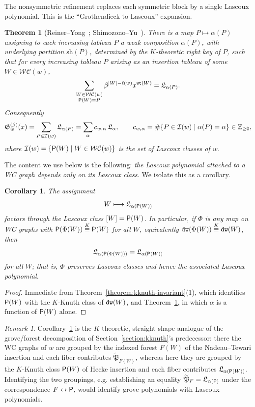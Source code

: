 \documentclass{amsart}
\newtheorem{corollary}[lemma]{Corollary}
\newtheorem{theorem}[lemma]{Theorem}
\newcommand{\grove}{\widetilde{\mathfrak{P}}}
\theoremstyle{definition}
\theoremstyle{remark}
\newtheorem*{remark}{Remark}
\numberwithin{equation}{subsection}
\newcommand{\wtt}{\mathtt{wt}}
\newcommand{\WC}{\mathcal{WC}}
\begin{document}
The nonsymmetric refinement replaces each symmetric block by a single Lascoux
polynomial. This is the ``Grothendieck to Lascoux'' expansion.

\begin{theorem}[Reiner--Yong~\cite{reiner2021grothlascoux};
Shimozono--Yu~\cite{shimozono2021grothlascoux}]
\label{theorem:groth-lascoux}
There is a map $P\mapsto\alpha(P)$ assigning to each increasing tableau $P$ a
weak composition $\alpha(P)$, with underlying partition $\mathrm{sh}(P)$,
determined by the $K$-theoretic right key of $P$, such that for every increasing
tableau $P$ arising as an insertion tableau of some $W\in\WC(w)$,
$$\sum_{\substack{W\in\WC(w)\\ \Pw(W)=P}}\beta^{|W|-\ell(w)}x^{\wtt(W)}
   =\lasc_{\alpha(P)}.$$
Consequently
$$\mathfrak{G}^{(\beta)}_w(x)=\sum_{P\in\mathcal{I}(w)}\mathfrak{L}_{\alpha(P)}
   =\sum_{\alpha}c_{w,\alpha}\,\mathfrak{L}_{\alpha},\qquad
   c_{w,\alpha}=\#\{P\in\mathcal{I}(w)\mid\alpha(P)=\alpha\}\in\mathbb{Z}_{\geq0},$$
where $\mathcal{I}(w)=\{\Pw(W)\mid W\in\WC(w)\}$ is the set of Lascoux classes of
$w$.
\end{theorem}

The content we use below is the following: \emph{the Lascoux polynomial attached
to a WC graph depends only on its Lascoux class.} We isolate this as a corollary.

\begin{corollary}
\label{corollary:class-determines-lascoux}
The assignment
$$W\longmapsto \mathfrak{L}_{\alpha(\mathsf{P}(W))}$$
factors through the Lascoux class $[W]=\mathsf{P}(W)$. In particular, if $\Phi$ is any
map on WC graphs with $\mathsf{P}(\Phi(W))\overset{K}{\equiv}\mathsf{P}(W)$ for all $W$, equivalently
$\mathtt{dw}(\Phi(W))\overset{K}{\equiv}\mathtt{dw}(W)$, then
$$\mathfrak{L}_{\alpha(\mathsf{P}(\Phi(W)))}=\mathfrak{L}_{\alpha(\mathsf{P}(W))}$$
for all $W$; that is, $\Phi$ preserves Lascoux classes and hence the associated
Lascoux polynomial.
\end{corollary}

\begin{proof}
Immediate from Theorem~\ref{theorem:kknuth-invariant}(1), which identifies
$\mathsf{P}(W)$ with the $K$-Knuth class of $\mathtt{dw}(W)$, and
Theorem~\ref{theorem:groth-lascoux}, in which $\alpha$ is a function of $\mathsf{P}(W)$
alone.
\end{proof}

\begin{remark}
Corollary~\ref{corollary:class-determines-lascoux} is the $K$-theoretic,
straight-shape analogue of the grove/forest decomposition of
Section~\ref{section:kknuth}'s predecessor: there the WC graphs of $w$ are
grouped by the indexed forest $F(W)$ of the Nadeau--Tewari insertion and each
fiber contributes $\grove_{F(W)}$, whereas here they are grouped by the
$K$-Knuth class $\mathsf{P}(W)$ of Hecke insertion and each fiber contributes
$\mathfrak{L}_{\alpha(\mathsf{P}(W))}$. Identifying the two groupings, e.g. establishing an
equality $\grove_{F}=\lasc_{\alpha(\Pw)}$ under the correspondence
$F\leftrightarrow\mathsf{P}$, would identify grove polynomials with Lascoux
polynomials.
\end{remark}
\end{document}
